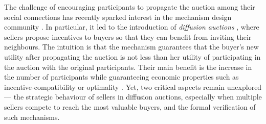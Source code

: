 \documentclass[letterpaper]{article} %
\theoremstyle{definition}
\begin{document}
The challenge of encouraging participants to propagate the auction among their social connections has recently sparked interest in the mechanism design community \cite{zhao2021mechanism}.
In particular, it led to the introduction of \textit{diffusion auctions} \cite{zhao2018selling,LiHGZ22}, where sellers propose incentives to buyers so that they can %
benefit from inviting their neighbours. The intuition is that the mechanism guarantees that the buyer’s new utility after propagating the auction is not less than her utility of participating in the auction with the original participants. 
Their main benefit is the increase in the number of participants while guaranteeing economic properties such as incentive-compatibility or optimality \cite{ZhangZZ24}.  
Yet, two critical aspects remain unexplored --- the strategic behaviour of sellers in diffusion auctions, especially when multiple sellers %
compete to reach the most valuable buyers, and the formal verification of such mechanisms. %






\end{document}
